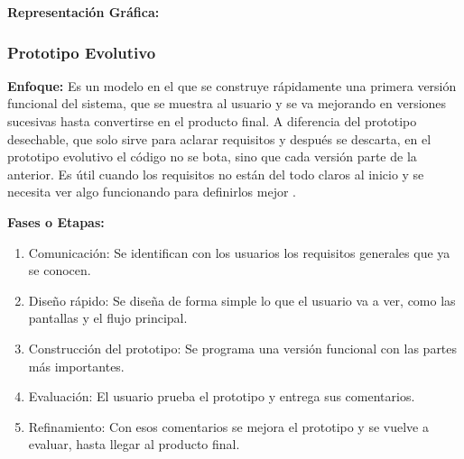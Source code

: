 \textbf{Representación Gráfica:}
\vspace{0.5cm}
\begin{center}
\end{center}
\newpage
\subsubsection{Prototipo Evolutivo}
\textbf{Enfoque:} Es un modelo en el que se construye rápidamente una primera versión funcional del sistema, que se muestra al usuario y se va mejorando en versiones sucesivas hasta convertirse en el producto final. A diferencia del prototipo desechable, que solo sirve para aclarar requisitos y después se descarta, en el prototipo evolutivo el código no se bota, sino que cada versión parte de la anterior. Es útil cuando los requisitos no están del todo claros al inicio y se necesita ver algo funcionando para definirlos mejor \citep{sommerville2015, pressman2010}.

\textbf{Fases o Etapas:}
\begin{enumerate}
    \item Comunicación: Se identifican con los usuarios los requisitos generales que ya se conocen.
    \item Diseño rápido: Se diseña de forma simple lo que el usuario va a ver, como las pantallas y el flujo principal.
    \item Construcción del prototipo: Se programa una versión funcional con las partes más importantes.
    \item Evaluación: El usuario prueba el prototipo y entrega sus comentarios.
    \item Refinamiento: Con esos comentarios se mejora el prototipo y se vuelve a evaluar, hasta llegar al producto final.
\end{enumerate}

